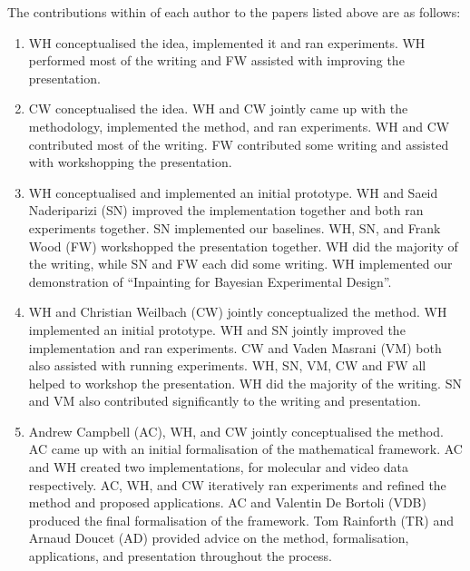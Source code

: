 The contributions within of each author to the papers listed above are as follows:
\begin{enumerate}
    \item WH conceptualised the idea, implemented it and ran experiments. WH performed most of the writing and FW assisted with improving the presentation.
    \item CW conceptualised the idea. WH and CW jointly came up with the methodology, implemented the method, and ran experiments. WH and CW contributed most of the writing. FW contributed some writing and assisted with workshopping the presentation.  
    \item WH conceptualised and implemented an initial prototype. WH and Saeid Naderiparizi (SN) improved the implementation together and both ran experiments together.  SN implemented our baselines. WH, SN, and Frank Wood (FW) workshopped the presentation together. WH did the majority of the writing, while SN and FW each did some writing. WH implemented our demonstration of ``Inpainting for Bayesian Experimental Design''.
    \item WH and Christian Weilbach (CW) jointly conceptualized the method. WH implemented an initial prototype. WH and SN jointly improved the implementation and ran experiments. CW and Vaden Masrani (VM) both also assisted with running experiments. WH, SN, VM, CW and FW all helped to workshop the presentation. WH did the majority of the writing. SN and VM also contributed significantly to the writing and presentation.
    \item Andrew Campbell (AC), WH, and CW jointly conceptualised the method. AC came up with an initial formalisation of the mathematical framework. AC and WH created two implementations, for molecular and video data respectively. AC, WH, and CW iteratively ran experiments and refined the method and proposed applications. AC and Valentin De Bortoli (VDB) produced the final formalisation of the framework. Tom Rainforth (TR) and Arnaud Doucet (AD) provided advice on the method, formalisation, applications, and presentation throughout the process.
\end{enumerate}